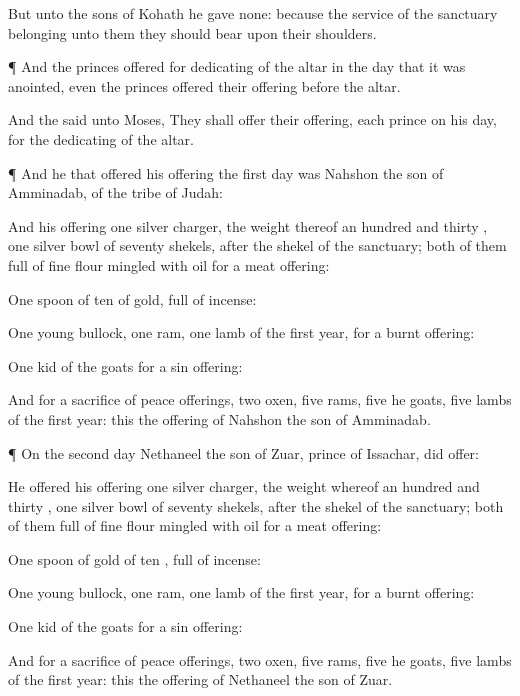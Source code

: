 {But unto the
sons of
Kohath he
gave
none: because the
service of the
sanctuary belonging unto them
{} they should
bear upon their
shoulders.


\par }{\PP {}¶ And the
princes
offered for
dedicating of the
altar in the
day that it was
anointed, even the
princes
offered their
offering
before the
altar.

And the
{}
said unto
Moses, They shall
offer their
offering,
each
prince on his
day, for the
dedicating of the
altar.


\par }{\PP {}¶ And he that
offered his
offering the
first
day was
Nahshon the
son of
Amminadab, of the
tribe of
Judah:

And his
offering
{}
one
silver
charger, the
weight thereof
{} an
hundred and
thirty
{},
one
silver
bowl of
seventy
shekels, after the
shekel of the
sanctuary;
both of them
{}
full of fine
flour
mingled with
oil for a meat
offering:

One
spoon of
ten
{} of
gold,
full of
incense:

One
young
bullock,
one
ram,
one
lamb of the
first
year, for a burnt
offering:

One
kid of the
goats for a sin
offering:

And for a
sacrifice of peace
offerings,
two
oxen,
five
rams,
five he
goats,
five
lambs of the
first
year: this
{} the
offering of
Nahshon the
son of
Amminadab.


\par }{\PP {}¶ On the
second
day
Nethaneel the
son of
Zuar,
prince of
Issachar, did
offer:

He
offered
{} his
offering
one
silver
charger, the
weight whereof
{} an
hundred and
thirty
{},
one
silver
bowl of
seventy
shekels, after the
shekel of the
sanctuary;
both of them
full of fine
flour
mingled with
oil for a meat
offering:

One
spoon of
gold of
ten
{},
full of
incense:

One
young
bullock,
one
ram,
one
lamb of the
first
year, for a burnt
offering:

One
kid of the
goats for a sin
offering:

And for a
sacrifice of peace
offerings,
two
oxen,
five
rams,
five he
goats,
five
lambs of the
first
year: this
{} the
offering of
Nethaneel the
son of
Zuar.


}
